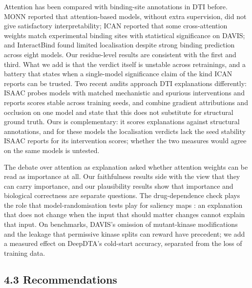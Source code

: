 \documentclass[
  11pt,
]{article}
\begin{document}
Attention has been compared with binding-site annotations in DTI before. MONN \citep{Li2020} reported that attention-based models, without extra supervision, did not give satisfactory interpretability; ICAN \citep{Kurata2022} reported that some cross-attention weights match experimental binding sites with statistical significance on DAVIS; and InteractBind \citep[][preprint]{Meng2026} found limited localisation despite strong binding prediction across eight models. Our residue-level results are consistent with the first and third. What we add is that the verdict itself is unstable across retrainings, and a battery that states when a single-model significance claim of the kind ICAN reports can be trusted. Two recent audits approach DTI explanations differently: ISAAC \citep[][preprint]{Tarantino2026} probes models with matched mechanistic and spurious interventions and reports scores stable across training seeds, and \citet[][preprint]{Vefghi2026} combine gradient attributions and occlusion on one model and state that this does not substitute for structural ground truth. Ours is complementary: it scores explanations against structural annotations, and for these models the localisation verdicts lack the seed stability ISAAC reports for its intervention scores; whether the two measures would agree on the same models is untested.

The debate over attention as explanation \citep{Jain2019,Wiegreffe2019} asked whether attention weights can be read as importance at all. Our faithfulness results side with the view that they can carry importance, and our plausibility results show that importance and biological correctness are separate questions. The drug-dependence check plays the role that model-randomisation tests play for saliency maps \citep{Adebayo2018}: an explanation that does not change when the input that should matter changes cannot explain that input. On benchmarks, DAVIS's omission of mutant-kinase modifications \citep[][preprint]{Wu2025} and the leakage that permissive kinase splits can reward \citep[][preprint]{Ong2023} have precedent; we add a measured effect on DeepDTA's cold-start accuracy, separated from the loss of training data.

\subsection{4.3 Recommendations}\label{recommendations}
\end{document}

